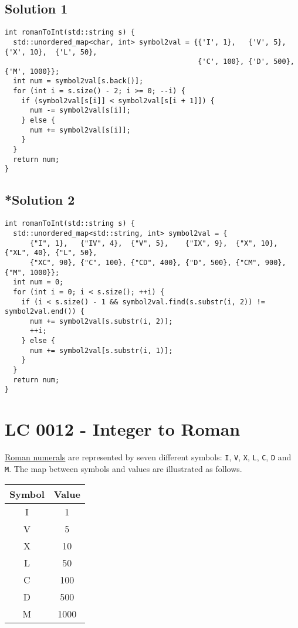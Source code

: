 \subsection*{Solution 1}
\begin{lstlisting}
int romanToInt(std::string s) {
  std::unordered_map<char, int> symbol2val = {{'I', 1},   {'V', 5},   {'X', 10},  {'L', 50},
                                              {'C', 100}, {'D', 500}, {'M', 1000}};
  int num = symbol2val[s.back()];
  for (int i = s.size() - 2; i >= 0; --i) {
    if (symbol2val[s[i]] < symbol2val[s[i + 1]]) {
      num -= symbol2val[s[i]];
    } else {
      num += symbol2val[s[i]];
    }
  }
  return num;
}
\end{lstlisting}

\subsection*{*Solution 2}
\begin{lstlisting}
int romanToInt(std::string s) {
  std::unordered_map<std::string, int> symbol2val = {
      {"I", 1},   {"IV", 4},  {"V", 5},    {"IX", 9},  {"X", 10},   {"XL", 40}, {"L", 50},
      {"XC", 90}, {"C", 100}, {"CD", 400}, {"D", 500}, {"CM", 900}, {"M", 1000}};
  int num = 0;
  for (int i = 0; i < s.size(); ++i) {
    if (i < s.size() - 1 && symbol2val.find(s.substr(i, 2)) != symbol2val.end()) {
      num += symbol2val[s.substr(i, 2)];
      ++i;
    } else {
      num += symbol2val[s.substr(i, 1)];
    }
  }
  return num;
}
\end{lstlisting}

\section{LC 0012 - Integer to Roman}
\ul{Roman numerals} are represented by seven different symbols: {\colorbox{CodeBackground}{\lstinline|I|}}, {\colorbox{CodeBackground}{\lstinline|V|}}, {\colorbox{CodeBackground}{\lstinline|X|}}, {\colorbox{CodeBackground}{\lstinline|L|}}, {\colorbox{CodeBackground}{\lstinline|C|}}, {\colorbox{CodeBackground}{\lstinline|D|}} and {\colorbox{CodeBackground}{\lstinline|M|}}. The map between symbols and values are illustrated as follows.

\begin{table}[H]
\centering
\begin{tabular}{|c|c|}
\hline
Symbol & Value \\ \hline
I      & 1     \\ \hline
V      & 5     \\ \hline
X      & 10    \\ \hline
L       & 50 \\ \hline
C       & 100 \\ \hline
D       & 500 \\ \hline
M       & 1000 \\ \hline
\end{tabular}
\end{table}

